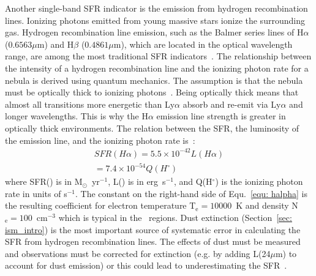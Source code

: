 Another single-band SFR indicator is the emission from hydrogen recombination lines. 
Ionizing photons emitted from young massive stars ionize the surrounding gas. Hydrogen recombination line emission, such as the Balmer series lines of H${\alpha}$ ($0.6563 \mu$m) and H${\beta}$ ($0.4861 \mu$m), which are located in the optical wavelength range, are among the most traditional SFR indicators~\citep{Kennicutt98a}. 
The relationship between the intensity of a hydrogen recombination line and the ionizing photon rate for a nebula is derived using quantum mechanics. 
The assumption is that the nebula must be optically thick to ionizing photons~\citep{Osterbrock06}.
Being optically thick means that almost all transitions more energetic than Ly${\alpha}$ absorb and re-emit via Ly${\alpha}$ and longer wavelengths.
This is why the H${\alpha}$ emission line strength is greater in optically thick environments. The relation between the SFR, the luminosity of the \halpha emission line, and the ionizing photon rate is~\citep[e.g.,][]{Osterbrock06, Kennicutt98b}:
\begin{align}
\label{equ: halpha}
SFR(H\alpha) = 5.5 \times 10^{-42}L(H\alpha) \\
                     = 7.4 \times 10^{-54}Q(H^{\circ})
\end{align}
where SFR(\halpha) is in M$_{\odot}$~yr$^{-1}$, L(\halpha) is in erg~s$^{-1}$, and Q(H$^{\circ}$) is the ionizing photon rate in units of s$^{-1}$.
The constant on the right-hand side of Equ.~\ref{equ: halpha} is the resulting coefficient for electron temperature T$_{\mathrm{e}}=10000$~K and density N$_{\mathrm{e}}=100$~cm$^{-3}$ which is typical in the \hii~regions. %
Dust extinction (Section~\ref{sec: ism_intro}) is the most important source of systematic error in calculating the SFR from hydrogen recombination lines.
The effects of dust must be measured and \halpha observations must be corrected for extinction (e.g. by adding L(24$\mu$m) to account for dust emission) or this could lead to underestimating the SFR~\citep{Kennicutt98b}.



